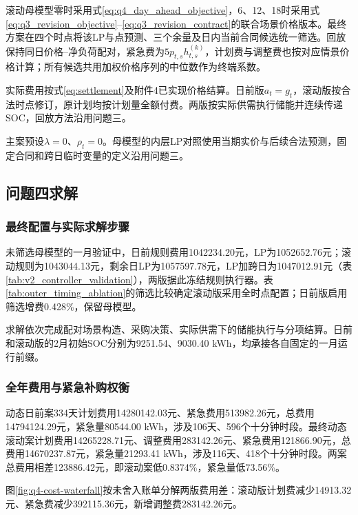 滚动母模型零时采用式\eqref{eq:q4_day_ahead_objective}，6、12、18时采用式\eqref{eq:q3_revision_objective}--\eqref{eq:q3_revision_contract}的联合场景价格版本。最终方案在四个时点将该LP与点预测、三个余量及日内当前合同候选统一筛选。回放保持同日价格--净负荷配对，紧急费为$5p_{t,s}h_{t,s}^{(k)}$，计划费与调整费也按对应情景价格计算；所有候选共用加权价格序列的中位数作为终端系数。

实际费用按式\eqref{eq:settlement}及附件4已实现价格结算。日前版$a_t=g_t$，滚动版按合法时点修订，原计划均按计划量全额付费。两版按实际供需执行储能并连续传递SOC，回放方法沿用问题三。

主案预设$\lambda=0$、$\rho_t=0$。母模型的内层LP对照使用当期实价与后续合法预测，固定合同和跨日临时变量的定义沿用问题三。

\subsection{问题四求解}

\subsubsection{最终配置与实际求解步骤}

未筛选母模型的一月验证中，日前规则费用1042234.20元，LP为1052652.76元；滚动规则为1043044.13元，剩余日LP为1057597.78元，LP加跨日为1047012.91元（表\ref{tab:v2_controller_validation}），两版据此冻结规则执行器。表\ref{tab:outer_timing_ablation}的筛选比较确定滚动版采用全时点配置；日前版启用筛选增费0.428\%，保留母模型。

求解依次完成配对场景构造、采购决策、实际供需下的储能执行与分项结算。日前和滚动版的2月初始SOC分别为9251.54、9030.40 kWh，均承接各自固定的一月运行前缀。

\subsubsection{全年费用与紧急补购权衡}

动态日前案334天计划费用14280142.03元、紧急费用513982.26元，总费用14794124.29元，紧急量80544.00 kWh，涉及106天、596个十分钟时段。最终动态滚动案计划费用14265228.71元、调整费用283142.26元、紧急费用121866.90元，总费用14670237.87元，紧急量21293.41 kWh，涉及116天、418个十分钟时段。两案总费用相差123886.42元，即滚动案低0.8374\%，紧急量低73.56\%。

图\ref{fig:q4-cost-waterfall}按未舍入账单分解两版费用差：滚动版计划费减少14913.32元、紧急费减少392115.36元，新增调整费283142.26元。

